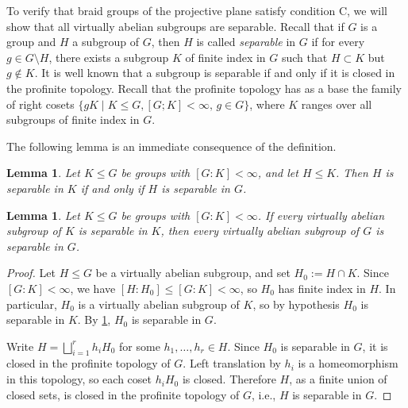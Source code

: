 \documentclass[a4paper,12pt,leqno]{amsart}
\newtheorem{lemma}[theorem]{Lemma}
\theoremstyle{definition}
\begin{document}
To verify that braid groups of the projective plane satisfy condition C, we will show that all virtually abelian subgroups are separable. Recall that if $G$ is a group and $H$ a subgroup of $G$, then $H$ is called
\emph{separable} in $G$ if for every $g \in G \setminus H$, there exists a subgroup $K$
of finite index in $G$ such that $H \subset K$ but $g \notin K$.  It is well known that a subgroup is separable if and only if it is closed in the profinite topology. Recall that the profinite topology has as a base the family of right cosets $\{gK \mid K \leq G, [G;K]< \infty, \, g \in G\}$, where $K$ ranges over all subgroups of finite index in $G$. 

The following lemma is an immediate consequence of the definition.

\begin{lemma}\label{lem:finite-index-separability}
Let $K \leq G$ be groups with $[G:K] < \infty$, and let $H \leq K$.
Then $H$ is separable in $K$ if and only if $H$ is separable in $G$.
\end{lemma}



\begin{lemma}\label{lem:vab-finite-index}
Let $K \leq G$ be groups with $[G:K] < \infty$. If every virtually
abelian subgroup of $K$ is separable in $K$, then every virtually
abelian subgroup of $G$ is separable in $G$.
\end{lemma}

\begin{proof}
Let $H \leq G$ be a virtually abelian subgroup, and set $H_0 := H \cap K$.
Since $[G:K] < \infty$, we have $[H:H_0] \leq [G:K] < \infty$, so $H_0$
has finite index in $H$. In particular, $H_0$ is a virtually abelian
subgroup of $K$, so by hypothesis $H_0$ is separable in $K$.
By \cref{lem:finite-index-separability}, $H_0$ is separable in $G$.

Write $H = \bigsqcup_{i=1}^{r} h_i H_0$ for some $h_1, \ldots, h_r \in H$.
Since $H_0$ is separable in $G$, it is closed in the profinite topology
of $G$. Left translation by $h_i$ is a homeomorphism in this topology,
so each coset $h_i H_0$ is closed. Therefore $H$, as a finite union of
closed sets, is closed in the profinite topology of $G$, i.e., $H$ is
separable in $G$.
\end{proof}
\end{document}
